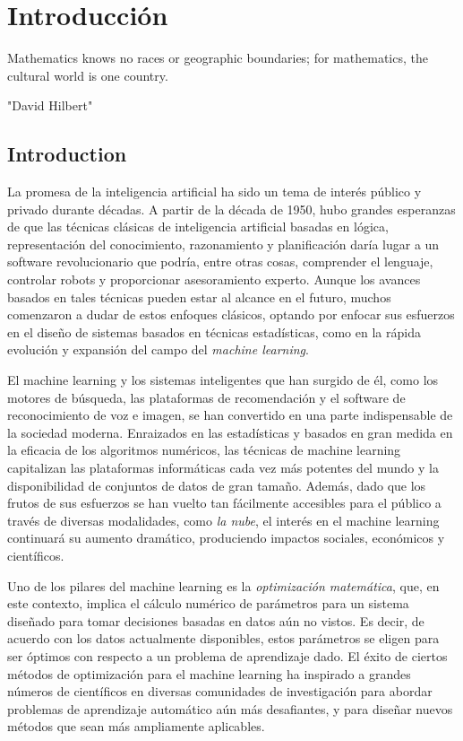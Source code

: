 \chapter{Introducci\'on}\label{ch:introduccion}

\epigraph{Mathematics knows no races
	or geographic boundaries;
	for mathematics,
	the cultural world
	is one country.}{"David Hilbert"}

\section{Introduction}


La promesa de la inteligencia artificial ha sido un tema de inter\'es p\'ublico y privado durante d\'ecadas. A partir de la d\'ecada de 1950, hubo grandes esperanzas de que las t\'ecnicas cl\'asicas de inteligencia artificial basadas en l\'ogica, representaci\'on del conocimiento, razonamiento y planificaci\'on dar\'ia lugar a un software revolucionario que podr\'ia, entre otras cosas, comprender el lenguaje, controlar robots y proporcionar asesoramiento experto. Aunque los avances basados en tales t\'ecnicas pueden estar al alcance en el futuro, muchos comenzaron a dudar de estos enfoques cl\'asicos, optando por enfocar sus esfuerzos en el dise\~no de sistemas basados en t\'ecnicas estad\'isticas, como en la r\'apida evoluci\'on y expansi\'on del campo del \textit{machine learning}.



El machine learning y los sistemas inteligentes que han surgido de \'el, como los motores de b\'usqueda, las plataformas de recomendaci\'on y el software de reconocimiento de voz e imagen, se han convertido en una parte indispensable de la sociedad moderna. Enraizados en las estad\'isticas y basados en gran medida en la eficacia de los algoritmos num\'ericos, las t\'ecnicas de machine learning capitalizan las plataformas inform\'aticas cada vez m\'as potentes del mundo y la disponibilidad de conjuntos de datos de gran tama\~no.  Adem\'as, dado que los frutos de sus esfuerzos se han vuelto tan f\'acilmente accesibles para el p\'ublico a trav\'es de diversas modalidades, como \textit{la nube}, el inter\'es en el machine learning continuar\'a su aumento dram\'atico, produciendo impactos sociales, econ\'omicos y cient\'ificos.


Uno de los pilares del machine learning es la \textit{optimizaci\'on matem\'atica}, que, en este contexto, implica el c\'alculo num\'erico de par\'ametros para un sistema dise\~nado para tomar decisiones basadas en datos a\'un no vistos. Es decir, de acuerdo con los datos actualmente disponibles, estos par\'ametros se eligen para ser \'optimos con respecto a un problema de aprendizaje dado. El \'exito de ciertos m\'etodos de optimizaci\'on para el machine learning ha inspirado a grandes n\'umeros de cient\'ificos en diversas comunidades de investigaci\'on para abordar problemas de aprendizaje autom\'atico a\'un m\'as desafiantes, y para dise\~nar nuevos m\'etodos que sean m\'as ampliamente aplicables.


